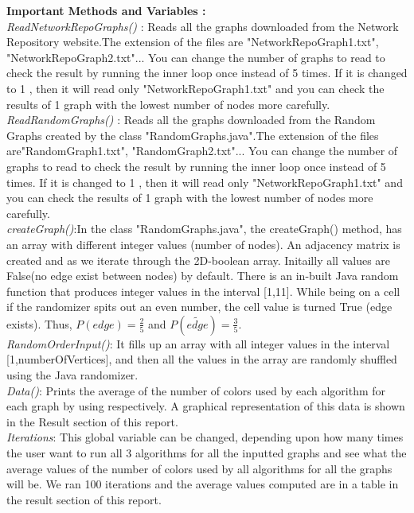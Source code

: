 \documentclass{article}
\begin{document}
\textbf{Important Methods and Variables :}\\

\textit{ReadNetworkRepoGraphs() }: Reads all the graphs downloaded from the Network Repository website.The extension of the files are
 "NetworkRepoGraph1.txt", "NetworkRepoGraph2.txt"... You can change the number of graphs to read to check the result by running the inner
 loop once instead of 5 times. If it is changed to 1 , then it will read only "NetworkRepoGraph1.txt" and you can check the results of 1 graph with 
the lowest number of nodes more carefully. \\ 

 \textit{ReadRandomGraphs() }: Reads all the graphs downloaded from the Random Graphs created by the class "RandomGraphs.java".The
 extension of the files are"RandomGraph1.txt", "RandomGraph2.txt"... You can change the number of graphs to read to check the result by 
running the inner loop once instead of 5 times. If it is changed to 1 , then it will read only "NetworkRepoGraph1.txt" and you can check the
 results of 1 graph with the lowest number of nodes more carefully.\\

\textit{createGraph()}:In the class "RandomGraphs.java", the createGraph() method, has an array with different integer values (number of nodes).
 An adjacency matrix is created and as we iterate through the 2D-boolean array. Initailly all values are False(no edge exist between nodes)
 by default. There is an in-built Java random function that produces integer values in the interval [1,11]. While being on a cell if the randomizer spits out an even number, the cell value is turned True (edge exists). Thus, $P(edge)= \frac{2}{5}$ and $P(\widetilde{edge})=\frac{3}{5}$.\\ 

\textit{RandomOrderInput()}: It fills up an array with all integer values in the interval [1,numberOfVertices], and then all the values in the array are
randomly shuffled using the Java randomizer.\\

\textit{Data()}: Prints the average of the number of colors used by each algorithm for each graph by using respectively. A graphical representation 
of this data is shown in the Result section of this report.\\

\textit{Iterations}: This global variable can be changed, depending upon how many times the user want to run all 3 algorithms for all the inputted 
graphs and see what the average values of the number of colors used by all algorithms for all the graphs will be. We ran 100 iterations and the 
average values computed are in a table in the result section of this report.\\
\end{document}
